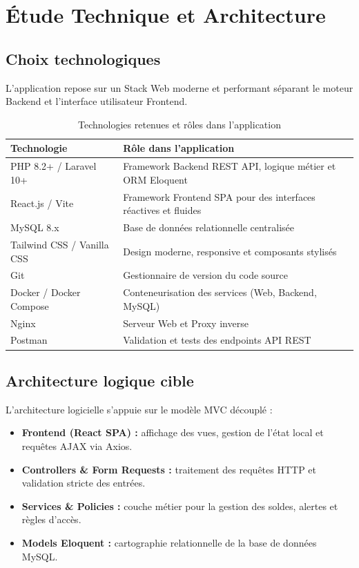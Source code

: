 \documentclass[12pt,a4paper]{report}
\begin{document}
\chapter{Étude Technique et Architecture}

\section{Choix technologiques}
L'application repose sur un Stack Web moderne et performant séparant le moteur Backend et l'interface utilisateur Frontend.

\begin{table}[H]
\centering
\caption{Technologies retenues et rôles dans l'application}
\label{tab:tech}
\begin{tabularx}{\textwidth}{l X}
\toprule
\textbf{Technologie} & \textbf{Rôle dans l'application} \\
\midrule
PHP 8.2+ / Laravel 10+ & Framework Backend REST API, logique métier et ORM Eloquent \\
React.js / Vite & Framework Frontend SPA pour des interfaces réactives et fluides \\
MySQL 8.x & Base de données relationnelle centralisée \\
Tailwind CSS / Vanilla CSS & Design moderne, responsive et composants stylisés \\
Git & Gestionnaire de version du code source \\
Docker / Docker Compose & Conteneurisation des services (Web, Backend, MySQL) \\
Nginx & Serveur Web et Proxy inverse \\
Postman & Validation et tests des endpoints API REST \\
\bottomrule
\end{tabularx}
\end{table}

\section{Architecture logique cible}
L'architecture logicielle s'appuie sur le modèle MVC découplé :
\begin{itemize}
    \item \textbf{Frontend (React SPA) :} affichage des vues, gestion de l'état local et requêtes AJAX via Axios.
    \item \textbf{Controllers \& Form Requests :} traitement des requêtes HTTP et validation stricte des entrées.
    \item \textbf{Services \& Policies :} couche métier pour la gestion des soldes, alertes et règles d'accès.
    \item \textbf{Models Eloquent :} cartographie relationnelle de la base de données MySQL.
\end{itemize}
\end{document}
